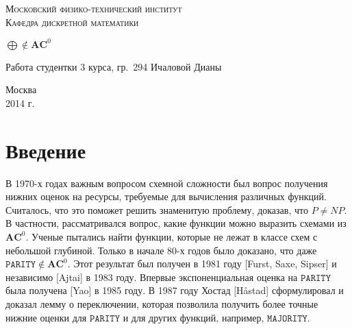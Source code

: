 \documentclass[12pt]{article}
\theoremstyle{plain}
\theoremstyle{remark}
\theoremstyle{definition}
\begin{document}
\begin{titlepage}

\begin{center}

\textsc{\Large Московский физико-технический институт}\\[0.5cm]
\textsc{\large Кафедра дискретной математики}\\[1cm]

\vfill


{ \LARGE  $\bigoplus \notin \mathbf{AC}^0$}
\end{center}

\vfill 

\begin{flushright} 
\begin{minipage}{0.5\textwidth}
\begin{flushright}
\normalsize
Работа студентки 3 курса, гр.~294 Ичаловой Дианы\\
\end{flushright}
\end{minipage}
\end{flushright}


\vfill

\begin{center}
{\large Москва\\
2014 г.}
\end{center}

\end{titlepage}


\section{Введение}

В 1970-х годах важным вопросом схемной сложности был вопрос получения нижних оценок на ресурсы, требуемые для вычисления различных функций. Считалось, что это поможет решить знаменитую проблему, доказав, что $P \ne NP$. В частности, рассматривался вопрос, какие функции можно выразить схемами из $\mathbf{AC}^0$. Ученые пытались найти функции, которые не лежат в классе схем с небольшой глубиной. Только в начале 80-х годов было доказано, что даже $\texttt{PARITY} \notin \mathbf{AC}^0$. Этот результат был получен в 1981 году [Furst, Saxe, Sipser] и независимо [Ajtai] в 1983 году. Впервые экспоненциальная оценка на  $\texttt{PARITY}$ была получена [Yao] в 1985 году. В 1987 году Хостад [H\aa stad] сформулировал и доказал лемму о переключении, которая позволила получить более точные нижние оценки для $\texttt{PARITY}$ и для других функций, например, $\texttt{MAJORITY}$.
\end{document}

